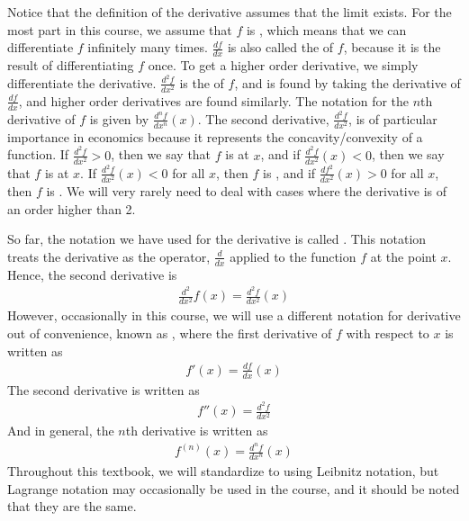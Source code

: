 Notice that the definition of the derivative assumes that the limit exists. For the most part in this course, we assume that $f$ is , which means that we can differentiate $f$ infinitely many times. $\frac{df}{dx}$ is also called the  of $f$, because it is the result of differentiating $f$ once. To get a higher order derivative, we simply differentiate the derivative. $\frac{d^2f}{dx^2}$ is the  of $f$, and is found by taking the derivative of $\frac{df}{dx}$, and higher order derivatives are found similarly. The notation for the $n$th derivative of $f$ is given by $\frac{d^nf}{dx^n}(x)$. The second derivative, $\frac{d^2f}{dx^2}$, is of particular importance in economics because it represents the concavity/convexity of a function. If $\frac{d^2f}{dx^2} > 0$, then we say that $f$ is  at $x$, and if $\frac{d^2f}{dx^2}(x) < 0$, then we say that $f$ is  at $x$. If $\frac{d^2f}{dx^2}(x) < 0$ for all $x$, then $f$ is , and if $\frac{df^2}{dx^2}(x) > 0$ for all $x$, then $f$ is . We will very rarely need to deal with cases where the derivative is of an order higher than 2.

So far, the notation we have used for the derivative is called . This notation treats the derivative as the operator, $\frac{d}{dx}$ applied to the function $f$ at the point $x$. Hence, the second derivative is
\begin{align*}
    \frac{d^2}{dx^2} f(x) = \frac{d^2f}{dx^2}(x)
\end{align*}
However, occasionally in this course, we will use a different notation for derivative out of convenience, known as , where the first derivative of $f$ with respect to $x$ is written as
\begin{align*}
    f'(x) = \frac{df}{dx}(x)
\end{align*}
The second derivative is written as
\begin{align*}
    f''(x) = \frac{d^2f}{dx^2}
\end{align*}
And in general, the $n$th derivative is written as
\begin{align*}
    f^{(n)}(x) = \frac{d^nf}{dx^n}(x)
\end{align*}
Throughout this textbook, we will standardize to using Leibnitz notation, but Lagrange notation may occasionally be used in the course, and it should be noted that they are the same. 

